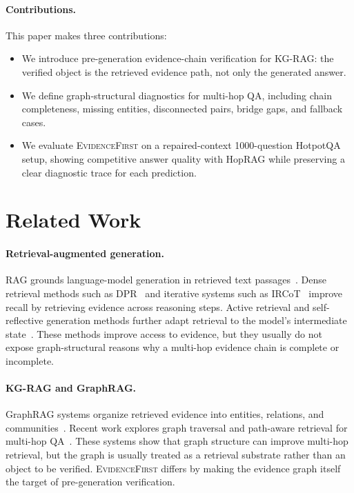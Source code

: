 \documentclass[runningheads]{llncs}
\newcommand{\sys}{\textsc{EvidenceFirst}\xspace}
\begin{document}
\paragraph{Contributions.}
This paper makes three contributions:
\begin{itemize}
    \item We introduce pre-generation evidence-chain verification for KG-RAG:
    the verified object is the retrieved evidence path, not only the generated
    answer.
    \item We define graph-structural diagnostics for multi-hop QA, including
    chain completeness, missing entities, disconnected pairs, bridge gaps, and
    fallback cases.
    \item We evaluate \sys on a repaired-context 1000-question HotpotQA setup,
    showing competitive answer quality with HopRAG while preserving a clear
    diagnostic trace for each prediction.
\end{itemize}

\section{Related Work}
\label{sec:related}

\paragraph{Retrieval-augmented generation.}
RAG grounds language-model generation in retrieved text passages~\cite{lewis2020rag}. Dense retrieval methods such as DPR~\cite{karpukhin2020dpr}
and iterative systems such as IRCoT~\cite{trivedi2022ircot} improve recall by
retrieving evidence across reasoning steps. Active retrieval and self-reflective
generation methods further adapt retrieval to the model's intermediate state~\cite{jiang2023active,asai2023selfrag}. These methods improve access to
evidence, but they usually do not expose graph-structural reasons why a
multi-hop evidence chain is complete or incomplete.

\paragraph{KG-RAG and GraphRAG.}
GraphRAG systems organize retrieved evidence into entities, relations, and
communities~\cite{edge2024graphrag,guo2024lightrag}. Recent work explores
graph traversal and path-aware retrieval for multi-hop QA~\cite{gutierrez2024hipporag,chen2025pathrag,yu2025hoprag}. These systems
show that graph structure can improve multi-hop retrieval, but the graph is
usually treated as a retrieval substrate rather than an object to be verified.
\sys differs by making the evidence graph itself the target of pre-generation
verification.
\end{document}
